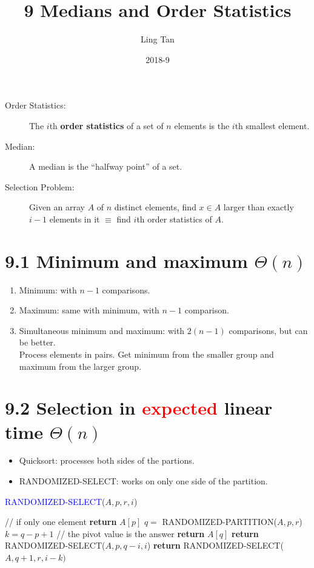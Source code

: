 \documentclass[a4paper]{article}
\title{9 Medians and Order Statistics}
\author{Ling Tan}
\date{2018-9}
\begin{document}
\maketitle
\begin{description}
\item[Order Statistics:] The $i$th \textbf{order statistics} of a set of $n$ elements is the $i$th smallest element.
\item[Median:] A median is the “halfway point” of a set.
\item[Selection Problem:] Given an array $A$ of $n$ distinct elements, find $x\in A$ larger than exactly $i-1$ elements in it $\equiv$ find $i$th order statistics of $A$.
\end{description}

\section*{9.1 Minimum and maximum $\Theta(n)$}
\begin{enumerate}
    \item Minimum: with $n-1$ comparisons.
    \item Maximum: same with minimum, with $n-1$ comparison.
    \item Simultaneous minimum and maximum: with $2(n-1)$ comparisons, but can be better.\\
    Process elements in pairs. Get minimum from the smaller group and maximum from the larger group.
\end{enumerate}
\section*{9.2 Selection in \textcolor{red}{expected} linear time $\Theta(n)$}
\begin{itemize}
    \item Quicksort: processes both sides of the partions.
    \item RANDOMIZED-SELECT: works on only one side of the partition.
\end{itemize}
\begin{algorithm}[H]%
    \caption{\textcolor{blue}{RANDOMIZED-SELECT}($A,p,r,i$)}
    \begin{algorithmic}[1] %
         // if only one element
            \State \textbf{return }$A[p]$
        \EndIf
        \State $q=$ RANDOMIZED-PARTITION($A,p,r$)
        \State $k=q-p+1$
         // the pivot value is the answer
            \State \textbf{return } $A[q]$
            \State \textbf{return } RANDOMIZED-SELECT($A,p,q-i,i$)
        \Else
            \State \textbf{return } RANDOMIZED-SELECT($A,q+1,r,i-k)$
        \EndIf
    \end{algorithmic}
\end{algorithm}
\end{document}
